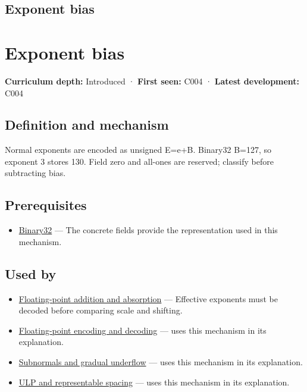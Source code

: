 \hypertarget{appendix-2fae058c82e1}{}
\section*{Exponent bias}
\chapter{Exponent bias}\label{appendix-2fae058c82e1-exponent-bias}

\textbf{Curriculum depth:} Introduced · \textbf{First seen:} C004 · \textbf{Latest development:} C004

\section{Definition and mechanism}\label{appendix-2fae058c82e1-definition-and-mechanism}

Normal exponents are encoded as unsigned E=e+B. Binary32 B=127, so exponent 3 stores 130. Field zero and all-ones are reserved; classify before subtracting bias.

\section{Prerequisites}\label{appendix-2fae058c82e1-prerequisites}

\begin{itemize}
\tightlist
\item
  \hyperref[appendix-5057f9ad327f]{Binary32} --- The concrete fields provide the representation used in this mechanism.
\end{itemize}

\section{Used by}\label{appendix-2fae058c82e1-used-by}

\begin{itemize}
\item
  \hyperref[appendix-a1b1b4580dfd]{Floating-point addition and absorption} --- Effective exponents must be decoded before comparing scale and shifting.
\item
  \hyperref[appendix-6854d0e2218e]{Floating-point encoding and decoding} --- uses this mechanism in its explanation.
\item
  \hyperref[appendix-00a6e044c437]{Subnormals and gradual underflow} --- uses this mechanism in its explanation.
\item
  \hyperref[appendix-14bab4cab9d4]{ULP and representable spacing} --- uses this mechanism in its explanation.
\end{itemize}

